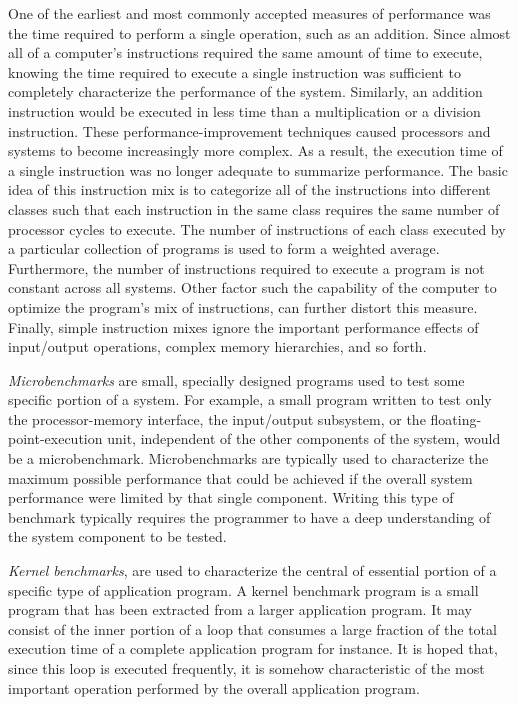 \documentclass[openany, a4paper]{book}
\theoremstyle{plain}
\theoremstyle{definition}
\theoremstyle{remark}
\begin{document}
One of the earliest and most commonly accepted measures of performance was
the time required to perform a single operation, such as an addition. Since
almost all of a computer's instructions required the same amount of time to
execute, knowing the time required to execute a single instruction was
sufficient to completely characterize the performance of the
system. Similarly, an addition instruction would be executed in less time
than a multiplication or a division instruction. These
performance-improvement techniques caused processors and systems to become
increasingly more complex. As a result, the execution time of a single
instruction was no longer adequate to summarize performance. The basic idea
of this instruction mix is to categorize all of the instructions into
different classes such that each instruction in the same class requires the
same number of processor cycles to execute. The number of instructions of
each class executed by a particular collection of programs is used to form a
weighted average. Furthermore, the number of instructions required to
execute a program is not constant across all systems. Other factor such the
capability of the computer to optimize the program's mix of instructions,
can further distort this measure. Finally, simple instruction mixes ignore
the important performance effects of input/output operations, complex memory
hierarchies, and so forth.

\emph{Microbenchmarks} are small, specially designed programs used to test some
specific portion of a system. For example, a small program written to test
only the processor-memory interface, the input/output subsystem, or the
floating-point-execution unit, independent of the other components of the
system, would be a microbenchmark. Microbenchmarks are typically used to
characterize the maximum possible performance that could be achieved if the
overall system performance were limited by that single component.
Writing this type of benchmark typically requires the programmer to have a
deep understanding of the system component to be tested.

\emph{Kernel benchmarks}, are used to characterize the central of essential portion
of a specific type of application program. A kernel benchmark program is a
small program that has been extracted from a larger application program. It
may consist of the inner portion of a loop that consumes a large fraction of
the total execution time of a complete application program for instance. It
is hoped that, since this loop is executed frequently, it is somehow
characteristic of the most important operation performed by the overall
application program.
\end{document}
